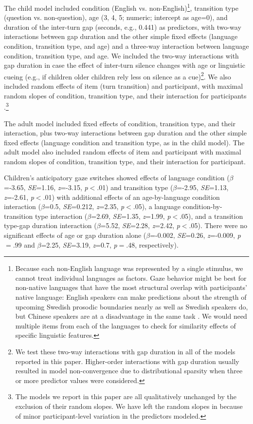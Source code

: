 \documentclass[authoryear, 12pt]{elsarticle}
\begin{document}
The child model included condition (English vs. non-English)\footnote{Because each non-English language was represented by a single stimulus, we cannot treat individual languages as factors. Gaze behavior might be best for non-native languages that have the most structural overlap with participants' native language: English speakers can make predictions about the strength of upcoming Swedish prosodic boundaries nearly as well as Swedish speakers do, but Chinese speakers are at a disadvantage in the same task \citep{carlson2005}. We would need multiple items from each of the languages to check for similarity effects of specific linguistic features.}, transition type (question vs. non-question), age (3, 4, 5; numeric; intercept as age=0), and duration of the inter-turn gap (seconds, e.g., 0.441) as predictors, with two-way interactions between gap duration and the other simple fixed effects (language condition, transition type, and age) and a three-way interaction between language condition, transition type, and age.  We included the two-way interactions with gap duration in case the effect of inter-turn silence changes with age or linguistic cueing (e.g., if children older children rely less on silence as a cue)\footnote{We test these two-way interactions with gap duration in all of the models reported in this paper. Higher-order interactions with gap duration usually resulted in model non-convergence due to distributional sparsity when three or more predictor values were considered.}. We also included random effects of item (turn transition) and participant, with maximal random slopes of condition, transition type, and their interaction for participants \citep{barr2013}.\footnote{The models we report in this paper are all qualitatively unchanged by the exclusion of their random slopes. We have left the random slopes in because of minor participant-level variation in the predictors modeled.}

The adult model included fixed effects of condition, transition type, and their interaction, plus two-way interactions between gap duration and the other simple fixed effects (language condition and transition type, as in the child model). The adult model also included random effects of item and participant with maximal random slopes of condition, transition type, and their interaction for participant.

Children's anticipatory gaze switches showed effects of language condition (\textit{$\beta$}=-3.65, \textit{SE}=1.16, \textit{z}=-3.15, \textit{p}$<$.01) and transition type (\textit{$\beta$}=-2.95, \textit{SE}=1.13, \textit{z}=-2.61, \textit{p}$<$.01) with additional effects of an age-by-language condition interaction (\textit{$\beta$}=0.5, \textit{SE}=0.212, \textit{z}=2.35, \textit{p}$<$.05), a language condition-by-transition type interaction (\textit{$\beta$}=2.69, \textit{SE}=1.35, \textit{z}=1.99, \textit{p}$<$.05), and a transition type-gap duration interaction (\textit{$\beta$}=5.52, \textit{SE}=2.28, \textit{z}=2.42, \textit{p}$<$.05). There were no significant effects of age or gap duration alone (\textit{$\beta$}=-0.002, \textit{SE}=0.26, \textit{z}=-0.009, \textit{p}$=$.99 and \textit{$\beta$}=2.25, \textit{SE}=3.19, \textit{z}=0.7, \textit{p}$=$.48, respectively).
\end{document}
